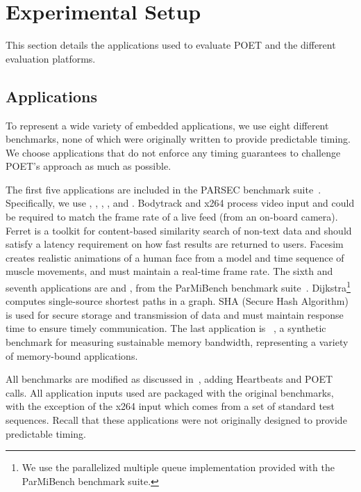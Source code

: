\section{Experimental Setup}
\label{sec:poet-usage}

This section details the applications used to evaluate POET and the different evaluation platforms.


\subsection{Applications}

To represent a wide variety of embedded applications, we use eight different benchmarks, none of which were originally written to provide predictable timing.
We choose applications that do not enforce any timing guarantees to challenge POET's approach as much as possible.

The first five applications are included in the PARSEC benchmark suite~\cite{parsec}.
Specifically, we use , , , , and .
Bodytrack and x264 process video input and could be required to match the frame rate of a live feed (\eg from an on-board camera).
Ferret is a toolkit for content-based similarity search of non-text data and should satisfy a latency requirement on how fast results are returned to users.
Facesim creates realistic animations of a human face from a model and time sequence of muscle movements, and must maintain a real-time frame rate.
The sixth and seventh applications are  and , from the ParMiBench benchmark suite~\cite{parmibench}.
Dijkstra\footnote{We use the parallelized multiple queue implementation provided with the ParMiBench benchmark suite.} computes single-source shortest paths in a graph.
SHA (Secure Hash Algorithm) is used for secure storage and transmission of data and must maintain response time to ensure timely communication.
The last application is ~\cite{stream}, a synthetic benchmark for measuring sustainable memory bandwidth, representing a variety of memory-bound applications.

All benchmarks are modified as discussed in~, adding Heartbeats and POET calls.
All application inputs used are packaged with the original benchmarks, with the exception of the x264 input which comes from a set of standard test sequences.
Recall that these applications were not originally designed to provide predictable timing.


